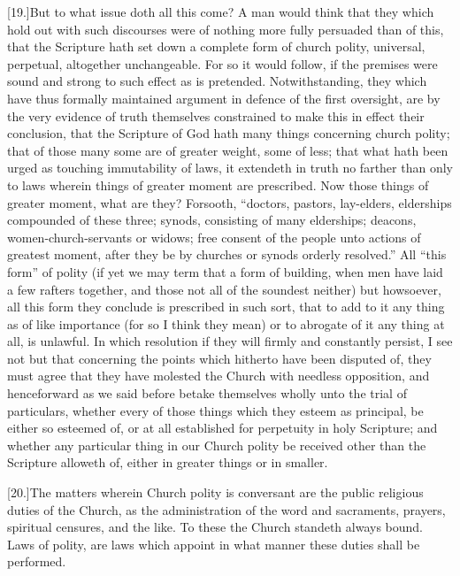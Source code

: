 [19.]But to what issue doth all this come? A man would think that they which hold out with such discourses were of nothing more fully persuaded than of this, that the Scripture hath set down a complete form of church polity, universal, perpetual, altogether unchangeable. For so it would follow, if the premises were sound and strong to such effect as is pretended. Notwithstanding, they which have thus formally maintained argument in defence of the first oversight, are by the very evidence of truth themselves constrained to make this in effect their conclusion, that the Scripture of God hath many things concerning church polity; that of those many some are of greater weight, some of less; that what hath been urged as touching immutability of laws, it extendeth in truth no farther than only to laws wherein things of greater moment are prescribed. Now those things of greater moment, what are they? Forsooth, “doctors, pastors, lay-elders, elderships compounded of these three; synods, consisting of many elderships; deacons, women-church-servants or widows; free consent of the people unto actions of greatest moment, after they be by churches or synods orderly resolved.” All “this form” of polity (if yet we may term that a form of building, when men have laid a few rafters together, and those not all of the soundest neither) but howsoever, all this form they conclude is prescribed in such sort, that to add to it any thing as of like importance (for so I think they mean) or to abrogate of it any thing at all, is unlawful. In which resolution if they will firmly and constantly persist, I see not but that concerning the points which hitherto have been disputed of, they must agree that they have molested the Church  with needless opposition, and henceforward as we said before betake themselves wholly unto the trial of particulars, whether every of those things which they esteem as principal, be either so esteemed of, or at all established for perpetuity in holy Scripture; and whether any particular thing in our Church polity be received other than the Scripture alloweth of, either in greater things or in smaller.

[20.]The matters wherein Church polity is conversant are the public religious duties of the Church, as the administration of the word and sacraments, prayers, spiritual censures, and the like. To these the Church standeth always bound. Laws of polity, are laws which appoint in what manner these duties shall be performed.

